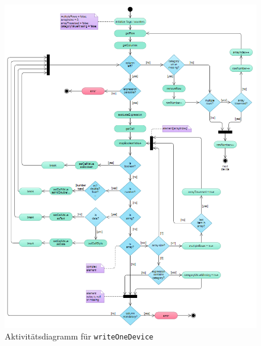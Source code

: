 \begin{figure}[!hbt]
 \centering
 \includegraphics[width=\textwidth]{Bilder/Aktivitaetsdiagramm}
 \caption[Aktivitätsdiagramm für \texttt{writeOneDevice} aus Ansatz\nbs\ref{MD}]{Aktivitätsdiagramm für \texttt{writeOneDevice}}
 \label{fig:akt1}
\end{figure}

